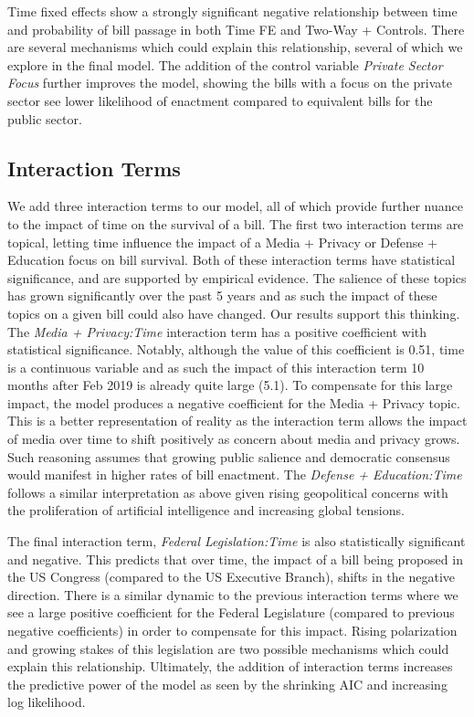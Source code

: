 \documentclass{article}
\begin{document}
Time fixed effects show a strongly significant negative relationship between time and probability of bill passage in both Time FE and Two-Way + Controls. There are several mechanisms which could explain this relationship, several of which we explore in the final model. The addition of the control variable \textit{Private Sector Focus} further improves the model, showing the bills with a focus on the private sector see lower likelihood of enactment compared to equivalent bills for the public sector. 

\subsection{Interaction Terms}

We add three interaction terms to our model, all of which provide further nuance to the impact of time on the survival of a bill. The first two interaction terms are topical, letting time influence the impact of a Media + Privacy or Defense + Education focus on bill survival. Both of these interaction terms have statistical significance, and are supported by empirical evidence. The salience of these topics has grown significantly over the past 5 years and as such the impact of these topics on a given bill could also have changed. Our results support this thinking. The \textit{Media + Privacy:Time} interaction term has a positive coefficient with statistical significance. Notably, although the value of this coefficient is 0.51, time is a continuous variable and as such the impact of this interaction term 10 months after Feb 2019 is already quite large (5.1). To compensate for this large impact, the model produces a negative coefficient for the Media + Privacy topic. This is a better representation of reality as the interaction term allows the impact of media over time to shift positively as concern about media and privacy grows. Such reasoning assumes that growing public salience and democratic consensus would manifest in higher rates of bill enactment. The \textit{Defense + Education:Time} follows a similar interpretation as above given rising geopolitical concerns with the proliferation of artificial intelligence and increasing global tensions. 

The final interaction term, \textit{Federal Legislation:Time} is also statistically significant and negative. This predicts that over time, the impact of a bill being proposed in the US Congress (compared to the US Executive Branch), shifts in the negative direction. There is a similar dynamic to the previous interaction terms where we see a large positive coefficient for the Federal Legislature (compared to previous negative coefficients) in order to compensate for this impact. Rising polarization and growing stakes of this legislation are two possible mechanisms which could explain this relationship. Ultimately, the addition of interaction terms increases the predictive power of the model as seen by the shrinking AIC and increasing log likelihood. 
\end{document}
